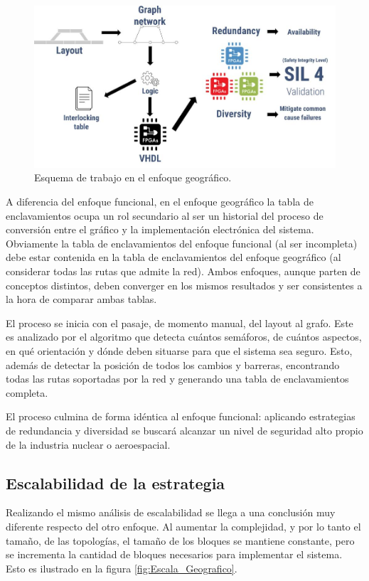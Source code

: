 		\begin{figure}[h]
		\centering
			\includegraphics[scale=.4]{./Figures/Geografico_workflow}
			\caption{Esquema de trabajo en el enfoque geográfico.}
			\label{fig:Work_Geografico}
		\end{figure}
	
		A diferencia del enfoque funcional, en el enfoque geográfico la tabla de enclavamientos ocupa un rol secundario al ser un historial del proceso de conversión entre el gráfico y la implementación electrónica del sistema. Obviamente la tabla de enclavamientos del enfoque funcional (al ser incompleta) debe estar contenida en la tabla de enclavamientos del enfoque geográfico (al considerar todas las rutas que admite la red). Ambos enfoques, aunque parten de conceptos distintos, deben converger en los mismos resultados y ser consistentes a la hora de comparar ambas tablas.
		
		El proceso se inicia con el pasaje, de momento manual, del layout al grafo. Este es analizado por el algoritmo que detecta cuántos semáforos, de cuántos aspectos, en qué orientación y dónde deben situarse para que el sistema sea seguro. Esto, además de detectar la posición de todos los cambios y barreras, encontrando todas las rutas soportadas por la red y generando una tabla de enclavamientos completa.
		
		El proceso culmina de forma idéntica al enfoque funcional: aplicando estrategias de redundancia y diversidad se buscará alcanzar un nivel de seguridad alto propio de la industria nuclear o aeroespacial.
		
		\subsection{Escalabilidad de la estrategia}	
			
			Realizando el mismo análisis de escalabilidad se llega a una conclusión muy diferente respecto del otro enfoque. Al aumentar la complejidad, y por lo tanto el tamaño, de las topologías, el tamaño de los bloques se mantiene constante, pero se incrementa la cantidad de bloques necesarios para implementar el sistema. Esto es ilustrado en la figura \ref{fig:Escala_Geografico}.
					
